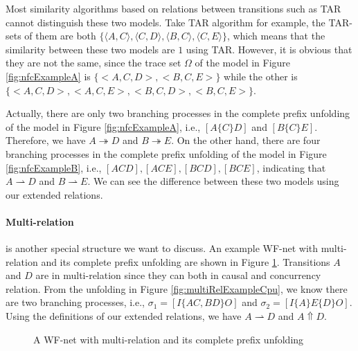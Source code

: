 \documentclass{llncs}
\begin{document}
Most similarity algorithms based on relations between transitions such as TAR cannot distinguish these two models. Take TAR algorithm for example, the TAR-sets of them are both $\{\langle A,C\rangle, \langle C,D\rangle, \langle B,C\rangle, \langle C,E\rangle\}$, which means that the similarity between these two models are $1$ using TAR. However, it is obvious that they are not the same, since the trace set $\Omega$ of the model in Figure \ref{fig:nfcExampleA} is $\{<A,C,D>,<B,C,E>\}$ while the other is $\{<A,C,D>,<A,C,E>,<B,C,D>,<B,C,E>\}$.

Actually, there are only two branching processes in the complete prefix unfolding of the model in Figure \ref{fig:nfcExampleA}, i.e., $[A\{C\}D]$ and $[B\{C\}E]$. Therefore, we have $A\twoheadrightarrow D$ and $B\twoheadrightarrow E$. On the other hand, there are four branching processes in the complete prefix unfolding of the model in Figure \ref{fig:nfcExampleB}, i.e., $[ACD],[ACE],[BCD],[BCE]$, indicating that $A\rightharpoonup D$ and $B\rightharpoonup E$. We can see the difference between these two models using our extended relations.

\paragraph{Multi-relation} is another special structure we want to discuss. An example WF-net with multi-relation and its complete prefix unfolding are shown in Figure \ref{fig:exampleMultiRelation}. Transitions $A$ and $D$ are in multi-relation since they can both in causal and concurrency relation. From the unfolding in Figure \ref{fig:multiRelExampleCpu}, we know there are two branching processes, i.e., $\sigma_{1}=[I\{AC,BD\}O]$ and $\sigma_{2}=[I\{A\}E\{D\}O]$. Using the definitions of our extended relations, we have $A\rightharpoonup D$ and $A\Uparrow D$.

\begin{figure}[htbp]
\centering
{}
\caption{A WF-net with multi-relation and its complete prefix unfolding\label{fig:exampleMultiRelation}}
\end{figure}
\end{document}
